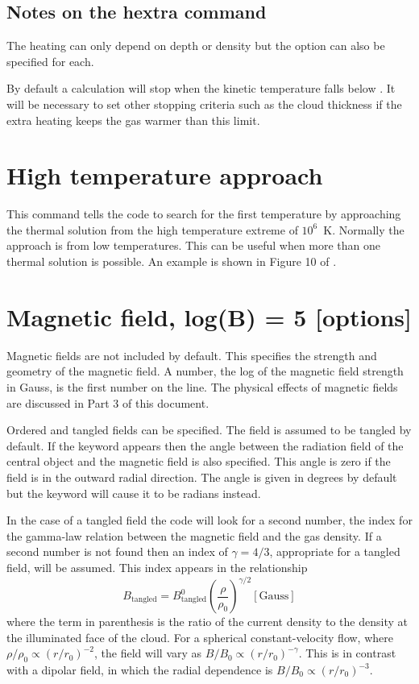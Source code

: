 \subsection{Notes on the hextra command}

The heating can only depend on depth or density
but the  option can
also be specified for each.

By default a calculation will stop when the kinetic temperature falls
below \TempStopDefault.  It will be necessary to set other stopping criteria such
as the cloud thickness if the extra heating keeps the gas warmer than this
limit.

\section{High temperature approach}

This command tells the code to search for the first temperature by
approaching the thermal solution from the high temperature extreme of $10^6$~K.
Normally the approach is from low temperatures.
This can be useful
when more than one thermal solution is possible.
An example is shown in Figure 10 of \citet{FerlandFabian2009}.

\section{Magnetic field, log(B) = 5 [options]}

Magnetic fields are not included by default.
This specifies the strength
and geometry of the magnetic field.
A number, the log of the magnetic field
strength in Gauss, is the first number on the line.
The physical effects
of magnetic fields are discussed in Part 3 of this document.

Ordered and tangled fields can be specified.
The field is assumed to
be tangled by default.
If the keyword  appears then the angle between
the radiation field of the central object and the magnetic field
is also specified.
This angle is zero if the field is in the outward radial
direction.
The angle is given in degrees by default but the
 keyword
will cause it to be radians instead.

In the case of a tangled field the code will look for a second number,
the index for the gamma-law relation between the magnetic field and the
gas density.
If a second number is not found then an index of $\gamma = 4/3$,
appropriate for a tangled field, will be assumed.
This index appears in the relationship
\begin{equation}
B_{{\mathrm{tangled}}}  = B_{{\mathrm{tangled}}}^0 \left( {\frac{\rho }{{\rho _0
}}} \right)^{\gamma /2}
 [\mathrm{Gauss}]
\end{equation}
where the term in parenthesis is the ratio of the current density to the
density at the illuminated face of the cloud.
For a spherical
constant-velocity flow, where ${\rho /\rho _0 }\propto(r/r_0 )^{-2} $, the
field will vary as  $B/B_0\propto( r/r_0 )^{-\gamma }$.
This is in contrast with a dipolar field,
in which the radial dependence
is $B/B_0 \propto( r /r_0 )^{-3}$.

